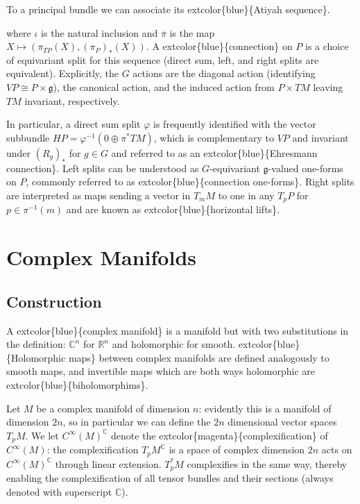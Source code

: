 \documentclass[
]{book}
\begin{document}
To a principal bundle we can associate its extcolor\{blue\}\{Atiyah sequence\}.

where \(\iota\) is the natural inclusion and \(\overline{\pi}\) is the map \(X \mapsto (\pi_{TP}(X), (\pi_P)_*(X))\). A extcolor\{blue\}\{connection\} on \(P\) is a choice of equivariant split for this sequence (direct sum, left, and right splits are equivalent). Explicitly, the \(G\) actions are the diagonal action (identifying \(VP \cong P \times \mathfrak{g}\)), the canonical action, and the induced action from \(P \times TM\) leaving \(TM\) invariant, respectively.

In particular, a direct sum split \(\varphi\) is frequently identified with the vector subbundle \(HP = \varphi^{-1}(0 \oplus \pi^* TM)\), which is complementary to \(VP\) and invariant under \((R_g)_*\) for \(g \in G\) and referred to as an extcolor\{blue\}\{Ehresmann connection\}. Left splits can be understood as \(G\)-equivariant \(\mathfrak{g}\)-valued one-forms on \(P\), commonly referred to as extcolor\{blue\}\{connection one-forms\}. Right splits are interpreted as maps sending a vector in \(T_m M\) to one in any \(T_p P\) for \(p \in \pi^{-1}(m)\) and are known as extcolor\{blue\}\{horizontal lifts\}.

\hypertarget{complex-manifolds}{%
\chapter{Complex Manifolds}\label{complex-manifolds}}

\hypertarget{construction-2}{%
\section{Construction}\label{construction-2}}

A extcolor\{blue\}\{complex manifold\} is a manifold but with two substitutions in the definition: \(\mathbb{C}^n\) for \(\mathbb{R}^n\) and holomorphic for smooth. extcolor\{blue\}\{Holomorphic maps\} between complex manifolds are defined analogously to smooth maps, and invertible maps which are both ways holomorphic are extcolor\{blue\}\{biholomorphims\}.

Let \(M\) be a complex manifold of dimension \(n\): evidently this is a manifold of dimension \(2n\), so in particular we can define the \(2n\) dimensional vector spaces \(T_p M\). We let \(C^\infty (M)^{\mathbb{C}}\) denote the extcolor\{magenta\}\{complexification\} of \(C^\infty(M)\): the complexification \(T_p M^{\mathbb{C}}\) is a space of complex dimension \(2n\) acts on \(C^\infty(M)^{\mathbb{C}}\) through linear extension. \(T_p^* M\) complexifies in the same way, thereby enabling the complexification of all tensor bundles and their sections (always denoted with superscript \(\mathbb{C}\)).
\end{document}
